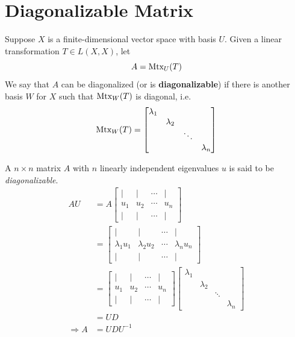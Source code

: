 \documentclass[11pt]{elegantbook}
\begin{document}
\section{Diagonalizable Matrix}
\begin{definition}[Diagonalizable]
    \normalfont
    Suppose $X$ is a finite-dimensional vector space with basis $U$. Given a linear transformation $T\in L(X,X)$, let $$A=\textnormal{Mtx}_U(T)$$
    We say that $A$ can be diagonalized (or is \textbf{diagonalizable}) if there is another basis $W$ for $X$ such that $\textnormal{Mtx}_W(T)$ is diagonal, i.e. $$\textnormal{Mtx}_W(T)=\begin{bmatrix}
        \lambda_1&&&\\
        &\lambda_2&&\\
        &&\ddots&\\
        &&&\lambda_n
    \end{bmatrix}$$
\end{definition}
A $n\times n$ matrix $A$ with $n$ linearly independent eigenvalues $u$ is said to be \textit{diagonalizable}.
\begin{equation}
    \begin{aligned}
        AU&=A\begin{bmatrix}
            |&|&\cdots&|\\
            u_1&u_2&\cdots&u_n\\
            |&|&\cdots&|
        \end{bmatrix}\\
        &=\begin{bmatrix}
            |&|&\cdots&|\\
            \lambda_1u_1&\lambda_2u_2&\cdots&\lambda_nu_n\\
            |&|&\cdots&|
        \end{bmatrix}\\
        &=\begin{bmatrix}
            |&|&\cdots&|\\
            u_1&u_2&\cdots&u_n\\
            |&|&\cdots&|
        \end{bmatrix}\begin{bmatrix}
            \lambda_1&&&\\
            &\lambda_2&&\\
            &&\ddots&\\
            &&&\lambda_n
        \end{bmatrix}\\
        &=UD\\
        \Rightarrow	A&=UDU^{-1}
    \end{aligned}
    \nonumber
\end{equation}
\end{document}
